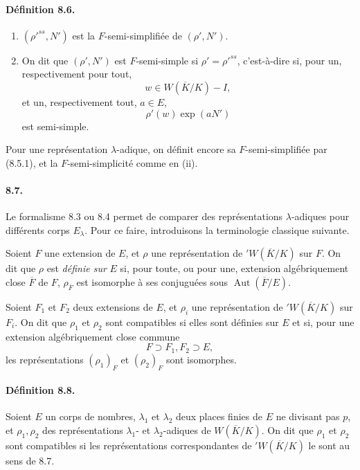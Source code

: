 \documentclass[10pt]{article}
\providecommand{\Aut}{\operatorname{Aut}}
\begin{document}
\paragraph{Définition 8.6.}
\begin{enumerate}[label=(\roman*)]
\item \((\rho'^{ss},N')\) est la \(F\)-semi-simplifiée de \((\rho',N')\).
\item On dit que \((\rho',N')\) est \(F\)-semi-simple si \(\rho'=\rho'^{ss}\), c'est-à-dire si, pour un, respectivement pour tout,
\[
w\in W(\overline K/K)-I,
\]
et un, respectivement tout, \(a\in E\),
\[
\rho'(w)\exp(aN')
\]
est semi-simple.
\end{enumerate}
Pour une représentation \(\lambda\)-adique, on définit encore sa \(F\)-semi-simplifiée par (8.5.1), et la \(F\)-semi-simplicité comme en (ii).

\paragraph{8.7.} Le formalisme 8.3 ou 8.4 permet de comparer des représentations \(\lambda\)-adiques pour différents corps \(E_\lambda\). Pour ce faire, introduisons la terminologie classique suivante.

Soient \(F\) une extension de \(E\), et \(\rho\) une représentation de \({}'W(\overline K/K)\) sur \(F\). On dit que \(\rho\) est \emph{définie sur} \(E\) si, pour toute, ou pour une, extension algébriquement close \(\overline F\) de \(F\), \(\rho_{\overline F}\) est isomorphe à ses conjuguées sous \(\Aut(\overline F/E)\).

Soient \(F_1\) et \(F_2\) deux extensions de \(E\), et \(\rho_i\) une représentation de \({}'W(\overline K/K)\) sur \(F_i\). On dit que \(\rho_1\) et \(\rho_2\) sont compatibles si elles sont définies sur \(E\) et si, pour une extension algébriquement close commune
\[
F\supset F_1,F_2\supset E,
\]
les représentations \((\rho_1)_F\) et \((\rho_2)_F\) sont isomorphes.

\paragraph{Définition 8.8.} Soient $E$ un corps de nombres, $\lambda_1$ et $\lambda_2$ deux places finies de $E$ ne divisant pas $p$, et $\rho_1,\rho_2$ des représentations $\lambda_1$- et $\lambda_2$-adiques de $W(\overline K/K)$. On dit que $\rho_1$ et $\rho_2$ sont compatibles si les représentations correspondantes de ${}'W(\overline K/K)$ le sont au sens de 8.7.
\end{document}
